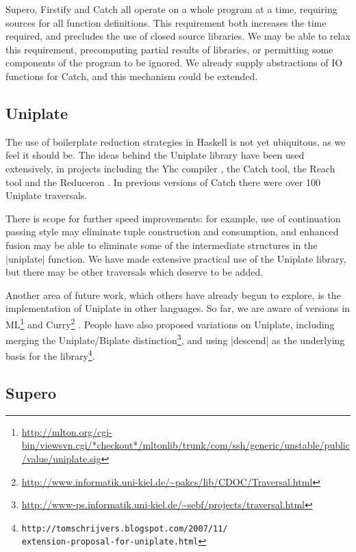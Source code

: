 Supero, Firstify and Catch all operate on a whole program at a time, requiring sources for all function definitions. This requirement both increases the time required, and precludes the use of closed source libraries. We may be able to relax this requirement, precomputing partial results of libraries, or permitting some components of the program to be ignored. We already supply abstractions of IO functions for Catch, and this mechanism could be extended.

\subsection{Uniplate}

The use of boilerplate reduction strategies in Haskell is not yet ubiquitous, as we feel it should be. The ideas behind the Uniplate library have been used extensively, in projects including the Yhc compiler \citep{me:yhc_core}, the Catch tool, the Reach tool \cite{naylor:reach} and the Reduceron \cite{naylor:reduceron}. In previous versions of Catch there were over 100 Uniplate traversals.

There is scope for further speed improvements: for example, use of continuation passing style may eliminate tuple construction and consumption, and enhanced fusion may be able to eliminate some of the intermediate structures in the |uniplate| function. We have made extensive practical use of the Uniplate library, but there may be other traversals which deserve to be added.

Another area of future work, which others have already begun to explore, is the implementation of Uniplate in other languages. So far, we are aware of versions in ML\footnote{\url{http://mlton.org/cgi-bin/viewsvn.cgi/*checkout*/mltonlib/trunk/com/ssh/generic/unstable/public/value/uniplate.sig}} \cite{ml} and Curry\footnote{\url{http://www.informatik.uni-kiel.de/~pakcs/lib/CDOC/Traversal.html}} \cite{curry}. People have also proposed variations on Uniplate, including merging the Uniplate/Biplate distinction\footnote{\url{http://www-ps.informatik.uni-kiel.de/~sebf/projects/traversal.html}}, and using |descend| as the underlying basis for the library\footnote{\texttt{http://tomschrijvers.blogspot.com/2007/11/\\extension-proposal-for-uniplate.html}}.

\subsection{Supero}

